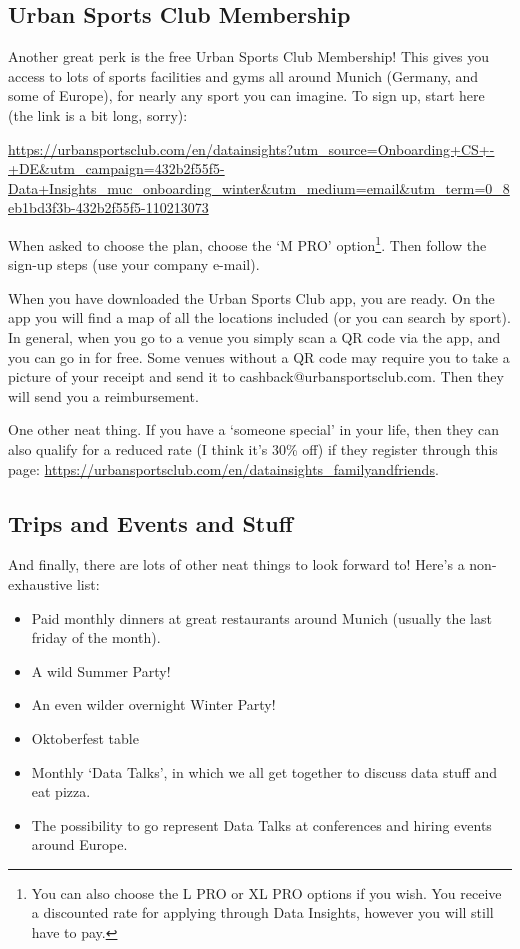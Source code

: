 \documentclass[11pt]{report}
\begin{document}
\subsection{Urban Sports Club Membership}
\label{Sports}
Another great perk is the free Urban Sports Club Membership! This gives you access to lots of sports facilities and gyms all around Munich (Germany, and some of Europe), for nearly any sport you can imagine. To sign up, start here (the link is a bit long, sorry):

\noindent \href{https://urbansportsclub.com/en/datainsights?utm_source=Onboarding+CS+-+DE&utm_campaign=432b2f55f5-Data+Insights_muc_onboarding_winter&utm_medium=email&utm_term=0_8eb1bd3f3b-432b2f55f5-110213073}{\tiny https://urbansportsclub.com/en/datainsights?utm\_source=Onboarding+CS+-+DE\&utm\_campaign=432b2f55f5-Data+Insights\_muc\_onboarding\_winter\&utm\_medium=email\&utm\_term=0\_8eb1bd3f3b-432b2f55f5-110213073}

When asked to choose the plan, choose the `M PRO' option\footnote{You can also choose the L PRO or XL PRO options if you wish. You receive a discounted rate for applying through Data Insights, however you will still have to pay.}. Then follow the sign-up steps (use your company e-mail).

When you have downloaded the Urban Sports Club app, you are ready. On the app you will find a map of all the locations included (or you can search by sport). In general, when you go to a venue you simply scan a QR code via the app, and you can go in for free. Some venues without a QR code may require you to take a picture of your receipt and send it to cashback@urbansportsclub.com. Then they will send you a reimbursement.

One other neat thing. If you have a `someone special' in your life, then they can also qualify for a reduced rate (I think it's 30\% off) if they register through this page:
\href{https://urbansportsclub.com/en/datainsights_familyandfriends}{\tiny https://urbansportsclub.com/en/datainsights\_familyandfriends}.


\subsection{Trips and Events and Stuff}
And finally, there are lots of other neat things to look forward to! Here's a non-exhaustive list:
\begin{itemize}
\item Paid monthly dinners at great restaurants around Munich (usually the last friday of the month).
\item A wild Summer Party!
\item An even wilder overnight Winter Party!
\item Oktoberfest table
\item Monthly `Data Talks', in which we all get together to discuss data stuff and eat pizza.
\item The possibility to go represent Data Talks at conferences and hiring events around Europe.
\end{itemize}
\end{document}
